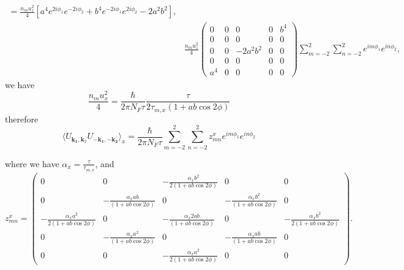 \documentclass[aps,prb,amsmath,amssymb,footinbib,showpacs,twocolumn]{revtex4-2}
\begin{document}
\begin{widetext}
\begin{align}
      =\frac{n_{m}u^{2}_{z}}{4}[a^{4}e^{2i\phi_{1}}e^{-2i\phi_{2}}+b^{4}e^{-2i\phi_{1}}e^{2i\phi_{2}}-2a^{2}b^{2}], \nonumber\\&\frac{n_{m}u^{2}_{z}}{4}\begin{pmatrix}
      0 & 0 & 0 & 0 & b^{4}\\
        0 & 0 & 0 & 0 & 0 \\
        0 & 0 & -2a^{2}b^{2} & 0 & 0 \\
        0 & 0 & 0 & 0 & 0\\
       a^{4} & 0 & 0 & 0 & 0
\end{pmatrix}\sum_{m=-2}^{2}\sum_{n=-2}^{2}e^{im\phi_{1}}e^{in\phi_{2}},
      \end{align}
we have
\begin{equation}
  \frac{n_{m}u^{2}_{x}}{4}=\frac{\hbar}{2\pi N_{F}\tau}\frac{\tau}{2\tau_{m,x}(1+ab\cos2\phi)}  
\end{equation}
therefore
 \begin{equation}
     \langle U_{\mathbf{k_1},\mathbf{k}_{2}}U_{\mathbf{-k_1},\mathbf{-k_2}}\bigl \rangle_{x}=\frac{\hbar}{2\pi N_{F}\tau}\sum_{m=-2}^{2}\sum_{n=-2}^{2}z^{x}_{mn}e^{im\phi_{1}}e^{in\phi_{2}}
 \end{equation}
 

where we have $\alpha_{x}=\frac{\tau}{\tau_{m,x}}$, and 
\begin{equation}
z^{x}_{mn}= \begin{pmatrix}
 0 & 0 & -\frac{\alpha_{x}b^{2}}{2(1+ab\cos2\phi)} & 0 & 0\\
        0 & -\frac{\alpha_{x}ab}{(1+ab\cos2\phi)} & 0 & -\frac{\alpha_{x}b^{2}}{(1+ab\cos2\phi)} & 0 \\
        -\frac{\alpha_{x}a^{2}}{2(1+ab\cos2\phi)} & 0 & -\frac{\alpha_{x}2ab}{(1+ab\cos2\phi)} & 0 & -\frac{\alpha_{x}b^{2}}{2(1+ab\cos2\phi)} \\
        0 & -\frac{\alpha_{x}a^{2}}{(1+ab\cos2\phi)} & 0 & -\frac{\alpha_{x}ab}{(1+ab\cos2\phi)} & 0\\
       0 & 0 & -\frac{\alpha_{x}a^{2}}{2(1+ab\cos2\phi)} & 0 & 0
\end{pmatrix}. 
\end{equation}


\end{widetext}
\end{document}
